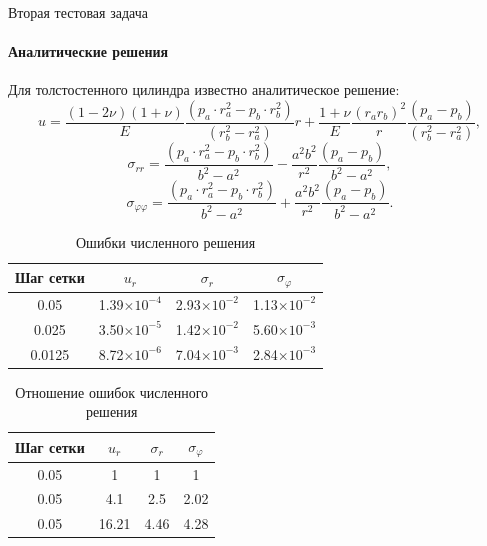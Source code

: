 \documentclass{beamer}
\begin{document}
\begin{frame}{Вторая тестовая задача}
\framesubtitle{Аналитические решения}
\footnotesize
Для толстостенного цилиндра известно аналитическое решение:
\begin{equation*}
u=\frac{\left(1-2\nu\right)\left(1+\nu\right)}{E} \frac{(p_a \cdot r_a^2 - p_b \cdot r_b^2)}{(r_b^2 - r_a^2)}r+\frac{1+\nu}{E}\frac{(r_a r_b)^2}{r}\frac{(p_a - p_b)}{(r_b^2 - r_a^2)},
\end{equation*}
\begin{equation*}
\sigma_{rr}=\frac{(p_a \cdot r_a^2 - p_b \cdot r_b^2)}{b^2-a^2}-\frac{a^2 b^2}{r^2}\frac{(p_a - p_b)}{b^2 -a^2},
\end{equation*}
\begin{equation*}
\sigma_{\varphi\varphi}=\frac{(p_a \cdot r_a^2 - p_b \cdot r_b^2)}{b^2-a^2}+\frac{a^2 b^2}{r^2}\frac{(p_a - p_b)}{b^2 -a^2}.
\end{equation*}

\begin{table}
\centering
\begin{tabular}{|c|c|c|c|}
\hline
Шаг сетки & $u_r$ & $\sigma_r$ & $\sigma_\varphi$\\
\hline
0.05 & 1.39$\times 10^{-4}$ & 2.93$\times 10^{-2}$ & 1.13$\times 10^{-2}$ \\
\hline
0.025 & 3.50$\times 10^{-5}$ & 1.42$\times 10^{-2}$ & 5.60$\times 10^{-3}$ \\
\hline
0.0125 & 8.72$\times 10^{-6}$ & 7.04$\times 10^{-3}$ & 2.84$\times 10^{-3}$ \\
\hline
\end{tabular}
\caption{Ошибки численного решения}
\end{table}

\begin{table}
\centering
\begin{tabular}{|c|c|c|c|}
\hline
Шаг сетки & $u_r$ & $\sigma_r$ & $\sigma_\varphi$\\
\hline
0.05 & 1 & 1 & 1 \\
\hline
0.05 & 4.1 & 2.5 & 2.02 \\
\hline
0.05 & 16.21 & 4.46 & 4.28 \\
\hline
\end{tabular}
\caption{Отношение ошибок численного решения}
\end{table}

\end{frame}
\end{document}
